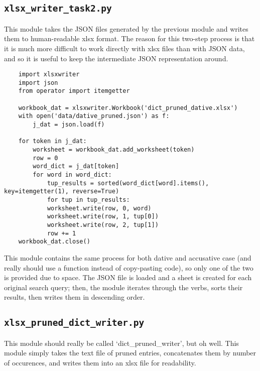 \documentclass{article}      %
\begin{document}
	\subsection{\texttt{xlsx\_writer\_task2.py}}
	
	This module takes the JSON files generated by the previous module and writes them to human-readable xlsx format. The reason for this two-step process is that it is much more difficult to work directly with xlsx files than with JSON data, and so it is useful to keep the intermediate JSON representation around.
	
	\begin{verbatim}
	import xlsxwriter
	import json
	from operator import itemgetter
	
	workbook_dat = xlsxwriter.Workbook('dict_pruned_dative.xlsx')
	with open('data/dative_pruned.json') as f:
		j_dat = json.load(f)
	
	for token in j_dat:
		worksheet = workbook_dat.add_worksheet(token)
		row = 0
		word_dict = j_dat[token]
		for word in word_dict:
			tup_results = sorted(word_dict[word].items(), key=itemgetter(1), reverse=True)
			for tup in tup_results:
			worksheet.write(row, 0, word)
			worksheet.write(row, 1, tup[0])
			worksheet.write(row, 2, tup[1])
			row += 1
	workbook_dat.close()
	\end{verbatim}
	
	This module contains the same process for both dative and accusative case (and really should use a function instead of copy-pasting code), so only one of the two is provided due to space. The JSON file is loaded and a sheet is created for each original search query; then, the module iterates through the verbs, sorts their results, then writes them in descending order.
	
	\subsection{\texttt{xlsx\_pruned\_dict\_writer.py}}
	
	This module should really be called `dict\_pruned\_writer', but oh well. This module simply takes the text file of pruned entries, concatenates them by number of occurences, and writes them into an xlsx file for readability.
	
\end{document}
